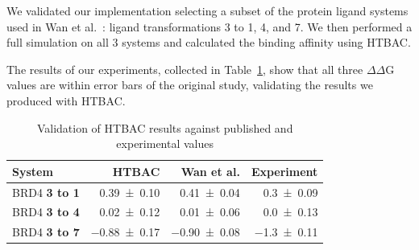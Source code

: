 We validated our implementation %
selecting a subset of the protein ligand systems used in Wan et
al.~\cite{Wan2017brd4}: ligand transformations 3 to 1, 4, and 7. We then
performed a full simulation on all 3 systems and calculated the binding
affinity using HTBAC.

The results of our experiments, collected in Table~\ref{tab:exp2}, show that
all three $\Delta \Delta$G values are within error bars of the original
study, validating the results we produced with HTBAC.

\begin{table}
  \centering
  \caption{Validation of HTBAC results against published and experimental
  values}\label{tab:exp2}  
  \begin{tabular}{lrrr}
    \toprule
    System & HTBAC & Wan et al. & Experiment \\
    \midrule
    BRD4 \textbf{3 to 1} & \num{0.39 +- 0.10} &   \num{0.41 +- 0.04} &  \num{0.3 +- 0.09} \\
    BRD4 \textbf{3 to 4} & \num{0.02 +- 0.12} &   \num{0.01 +- 0.06} &  \num{0.0 +- 0.13} \\
    BRD4 \textbf{3 to 7} & \num{-0.88 +- 0.17} &  \num{-0.90 +- 0.08} & \num{-1.3 +- 0.11} \\
    \bottomrule
  \end{tabular}
\up{}
\up{}
\up{}
\end{table}





